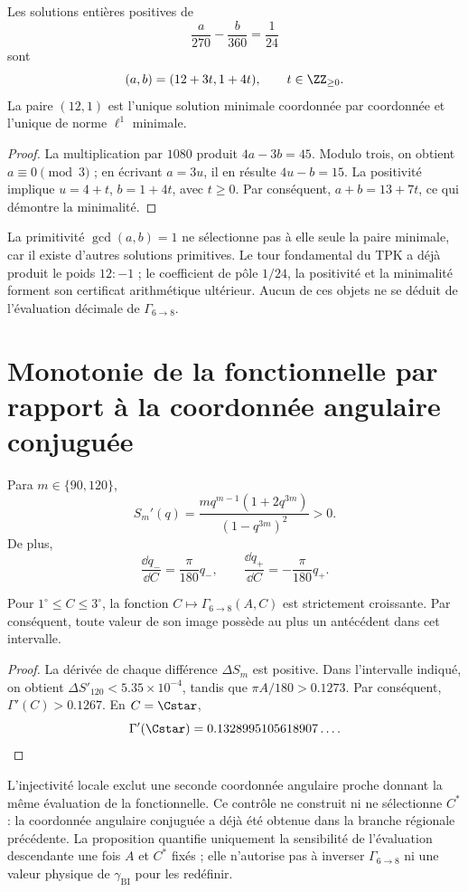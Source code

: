 \begin{theorem}
Les solutions entières positives de
\[
 \frac a{270}-\frac b{360}=\frac1{24}
\]
sont
\[
 (a,b)=(12+3t,1+4t),\qquad t\in\ZZ_{\geq0}.
\]
La paire \((12,1)\) est l’unique solution minimale coordonnée par coordonnée et
l’unique de norme \(\ell^1\) minimale.
\end{theorem}
\begin{proof}
La multiplication par \(1080\) produit \(4a-3b=45\). Modulo trois, on obtient
\(a\equiv0\pmod3\) ; en écrivant \(a=3u\), il en résulte \(4u-b=15\). La
positivité implique \(u=4+t\), \(b=1+4t\), avec \(t\geq0\). Par conséquent,
\(a+b=13+7t\), ce qui démontre la minimalité.
\end{proof}

La primitivité \(\gcd(a,b)=1\) ne sélectionne pas à elle seule la paire minimale, car
il existe d’autres solutions primitives. Le tour fondamental du TPK a déjà
produit le poids \(12:-1\) ; le coefficient de pôle \(1/24\), la positivité et la
minimalité forment son certificat arithmétique ultérieur. Aucun de ces
objets ne se déduit de l’évaluation décimale de \(\Gamma_{6\to8}\).

\newpage
\section{Monotonie de la fonctionnelle par rapport à la coordonnée angulaire conjuguée}

Para \(m\in\{90,120\}\),
\[
 S_m'(q)=\frac{m q^{m-1}(1+2q^{3m})}{(1-q^{3m})^2}>0.
\]
De plus,
\[
 \frac{\dd q_-}{\dd C}=\frac\pi{180}q_-,
 \qquad
 \frac{\dd q_+}{\dd C}=-\frac\pi{180}q_+.
\]

\begin{proposition}
Pour \(1^\circ\leq C\leq3^\circ\), la fonction
\(C\mapsto\Gamma_{6\to8}(A,C)\) est strictement croissante. Par conséquent,
toute valeur de son image possède au plus un antécédent dans cet intervalle.
\end{proposition}
\begin{proof}
La dérivée de chaque différence \(\Delta S_m\) est positive. Dans l’intervalle
indiqué, on obtient
\(\Delta S'_{120}<5.35\times10^{-4}\), tandis que
\(\pi A/180>0.1273\). Par conséquent,
\(\Gamma'(C)>0.1267\). En \(C=\Cstar\),
\[
 \Gamma'(\Cstar)=0.1328995105618907\ldots.
\]
\end{proof}

L’injectivité locale exclut une seconde coordonnée angulaire proche donnant la
même évaluation de la fonctionnelle. Ce contrôle ne construit ni ne sélectionne
\(C^*\) : la coordonnée angulaire conjuguée a déjà été obtenue dans la branche régionale précédente.
La proposition quantifie uniquement la sensibilité de l’évaluation descendante
une fois \(A\) et \(C^*\) fixés ; elle n’autorise pas à inverser
\(\Gamma_{6\to8}\) ni une valeur physique de \(\gamma_{\mathrm{BI}}\) pour
les redéfinir.
